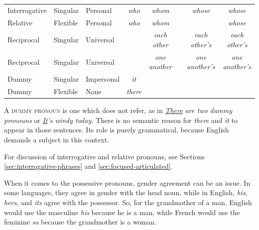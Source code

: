 \begin{table}
\begin{tabular}{l l l c c c c c}
Interrogative & Singular & Personal & \textit{who} & \textit{whom} & & \textit{whose} & \textit{whose} \\
Relative & Flexible & Personal & \textit{who} & \textit{whom} & &  & \textit{whose} \\
Reciprocal & Singular & Universal &  & \textit{each other} & & \textit{each other's} & \textit{each other's} \\
Reciprocal & Singular & Universal &  & \textit{one another} & & \textit{one another's} & \textit{one another's} \\
Dummy & Singular & Impersonal & \textit{it} & & & & \\
Dummy & Flexible & None & \textit{there} & & & & \\
\hline
\end{tabular}
\end{table}

A \textsc{dummy pronoun} is one which does not refer, as in \textit{\uline{There} are two dummy pronouns} or \textit{\uline{It}'s windy today.}\label{sec:dummy} There is no semantic reason for \textit{there} and \textit{it} to appear in those sentences. Its role is purely grammatical, because English demands a subject in this context.

For discussion of interrogative and relative pronouns, see Sections \ref{sec:interrogative-phrases} and \ref{sec:focused-articulated}.

When it comes to the possessive pronouns, gender agreement can be an issue. In some languages, they agree in gender with the head noun, while in English, \textit{his}, \textit{her\op\textit{s}\cp}, and \textit{its} agree with the possessor. So, for the grandmother of a man, English would use the masculine \textit{his} because he is a man, while French would use the feminine \textit{sa} because the grandmother is a woman.

\ea \label{ex:his-grandmother}
    \z
\ex \label{ex:her-grandmother}
    \z
\z


